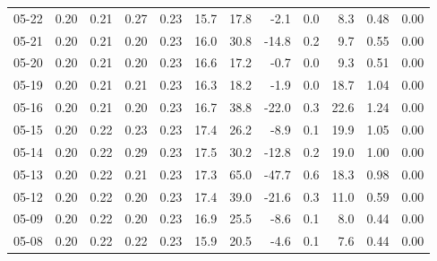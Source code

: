 \begin{threeparttable}
{\begin{tabular}{lrrrrrrrrrrr}
  05-22 &          0.20 &          0.21 &          0.27 &        0.23 &                15.7 &                17.8 &       -2.1 &                 0.0 &              8.3 &            0.48 &                   0.00 \\
  05-21 &          0.20 &          0.21 &          0.20 &        0.23 &                16.0 &                30.8 &      -14.8 &                 0.2 &              9.7 &            0.55 &                   0.00 \\
  05-20 &          0.20 &          0.21 &          0.20 &        0.23 &                16.6 &                17.2 &       -0.7 &                 0.0 &              9.3 &            0.51 &                   0.00 \\
  05-19 &          0.20 &          0.21 &          0.21 &        0.23 &                16.3 &                18.2 &       -1.9 &                 0.0 &             18.7 &            1.04 &                   0.00 \\
  05-16 &          0.20 &          0.21 &          0.20 &        0.23 &                16.7 &                38.8 &      -22.0 &                 0.3 &             22.6 &            1.24 &                   0.00 \\
  05-15 &          0.20 &          0.22 &          0.23 &        0.23 &                17.4 &                26.2 &       -8.9 &                 0.1 &             19.9 &            1.05 &                   0.00 \\
  05-14 &          0.20 &          0.22 &          0.29 &        0.23 &                17.5 &                30.2 &      -12.8 &                 0.2 &             19.0 &            1.00 &                   0.00 \\
  05-13 &          0.20 &          0.22 &          0.21 &        0.23 &                17.3 &                65.0 &      -47.7 &                 0.6 &             18.3 &            0.98 &                   0.00 \\
  05-12 &          0.20 &          0.22 &          0.20 &        0.23 &                17.4 &                39.0 &      -21.6 &                 0.3 &             11.0 &            0.59 &                   0.00 \\
  05-09 &          0.20 &          0.22 &          0.20 &        0.23 &                16.9 &                25.5 &       -8.6 &                 0.1 &              8.0 &            0.44 &                   0.00 \\
  05-08 &          0.20 &          0.22 &          0.22 &        0.23 &                15.9 &                20.5 &       -4.6 &                 0.1 &              7.6 &            0.44 &                   0.00 \\

\end{tabular}}
\end{threeparttable}
